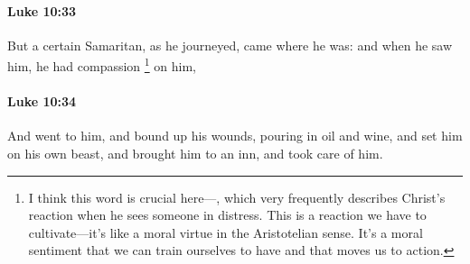 		\paragraph{Luke 10:33} %
			\label{LUKE-10-33}

			But a certain Samaritan, as he journeyed, came where he was: and when he saw him, he had compassion%
				\footnote{%
					I think this word is crucial here---, which very frequently describes Christ's reaction when he sees someone in distress. This is a reaction we have to cultivate---it's like a moral virtue in the Aristotelian sense. It's a moral sentiment that we can train ourselves to have and that moves us to action.
					}
			on him,

			\begin{framed}
			\scriptsize
				\begin{compactdesc}
					\item[SBLG]  \hyperref[SPLANCHNIZO]{}\gr{,}
				\end{compactdesc}
			\end{framed}

		\paragraph{Luke 10:34} %
			\label{LUKE-10-34}

			And went to him, and bound up his wounds, pouring in oil and wine, and set him on his own beast, and brought him to an inn, and took care of him.

